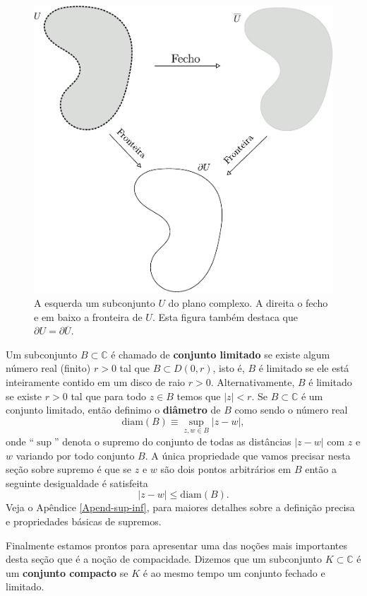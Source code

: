 \begin{figure}
\centering
\includegraphics[width=0.7\linewidth]{Figuras/fecho-fronteira}
\caption{A esquerda um subconjunto $U$ do plano complexo. A direita o fecho e em baixo a fronteira de $U$.
Esta figura também destaca que $\partial U = \partial \overline{U}$.}
\label{fig:fecho-fronteira}
\end{figure}


\medskip 
Um subconjunto $B\subset \mathbb{C}$ é chamado de {\bf conjunto limitado} 
se existe algum número real (finito) $r>0$ tal que 
$B\subset D(0,r)$, isto é, $B$ é limitado se ele está inteiramente contido em um disco de raio
$r>0$. Alternativamente, $B$ é limitado se existe $r>0$ tal que 
para todo $z\in B$ temos que  $|z|<r$. Se $B\subset \mathbb{C}$ é um conjunto limitado,
então definimo o {\bf diâmetro} de $B$ como sendo o número real 
\[
\mathrm{diam}(B) \equiv \sup_{z,w\in B}|z-w|,
\] 
onde ``$\sup$'' denota o supremo do conjunto de todas as distâncias $|z-w|$ com $z$ e $w$
variando por todo conjunto $B$. A única propriedade que vamos precisar nesta seção sobre
supremo é que se $z$ e $w$ são dois pontos arbitrários em $B$ então a seguinte desigualdade é satisfeita
\[
|z-w|\leqslant \mathrm{diam}(B).
\]
Veja o Apêndice \ref{Apend-sup-inf}, para maiores detalhes
sobre a definição precisa e propriedades básicas de supremos.


\medskip

Finalmente estamos prontos para apresentar uma das noções mais importantes desta seção
que é a noção de compacidade. Dizemos que um subconjunto $K\subset \mathbb{C}$ é um 
{\bf conjunto compacto} se $K$ é ao mesmo tempo um conjunto 
fechado e limitado. 

